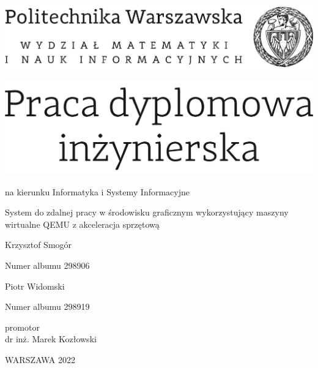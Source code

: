 \documentclass[12pt,twoside,a4paper]{article}
\newcommand{\discipline}{Informatyka i Systemy Informacyjne}
\renewcommand{\title}{System do zdalnej pracy w środowisku graficznym wykorzystujący maszyny wirtualne QEMU z akceleracja sprzętową}
\newcommand{\supervisor}{dr inż. Marek Kozłowski}
\renewcommand{\year}{2022}
\newcommand{\authori}{Krzysztof Smogór}
\newcommand{\albumi}{298906}
\newcommand{\authorii}{Piotr Widomski}
\newcommand{\albumii}{298919}
\begin{document}
\pagestyle{empty}

\begin{center}

\includegraphics[scale=1.]{img/politechnika}
\vspace{40pt}

\includegraphics[scale=1.]{img/praca_inz}  %

{ \arial na kierunku \discipline

\vspace{30pt}
{\arial \large \title}

\vspace{40pt}

{\arial \huge \authori }

\vspace{5pt}

Numer albumu \albumi

\vspace {20pt}
{\arial \huge \authorii}

\vspace{5pt}

Numer albumu \albumii

\vspace{40pt}

promotor \\
{\arial \supervisor}

\vspace{15pt}


 \vfill
WARSZAWA \year \\
}
\end{center}


%
%
\end{document}
